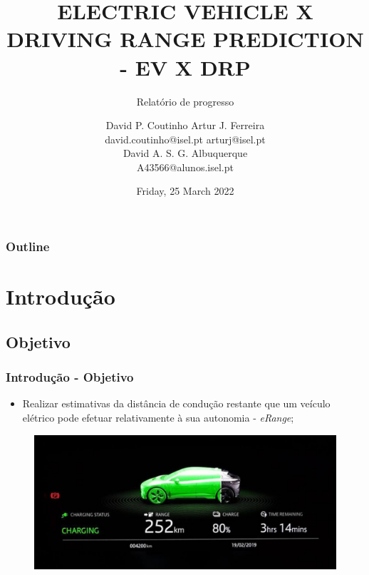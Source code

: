 \documentclass{beamer}
\title{\uppercase{Electric Vehicle X Driving Range Prediction - EV X DRP}}
\subtitle{Relatório de progresso}
\author{
	{\large David P. Coutinho \qquad Artur J. Ferreira} \\
	{\qquad \hspace{-1cm} david.coutinho@isel.pt \qquad arturj@isel.pt} \\
    {\vspace{1cm}}
    {\large David A. S. G. Albuquerque} \\
    {A43566@alunos.isel.pt}
}
\institute
{
	\vspace{0.5cm} \\
	{\normalsize Instituto Superior de Engenharia de Lisboa } \\
}
\date{
	\vspace{-0.75cm}
	Friday, 25 March 2022
}
\begin{document}
\begin{frame}[t,plain]
    \titlepage
\end{frame}

\begin{frame}
    \frametitle{Outline}
    \tableofcontents
\end{frame}

\section[Introdução]{Introdução}
\subsection[Objetivo]{Objetivo}
\begin{frame}
\frametitle{Introdução - Objetivo}

\begin{itemize}
	\item Realizar estimativas da distância de condução restante 
	que um veículo elétrico pode efetuar relativamente à sua autonomia - \textit{eRange};
\end{itemize}

\begin{figure}[H]
    \begin{center}
        \includegraphics[scale=0.25]{./figures/erange_gauge}
    \end{center}
\end{figure}

\end{frame}
\end{document}
